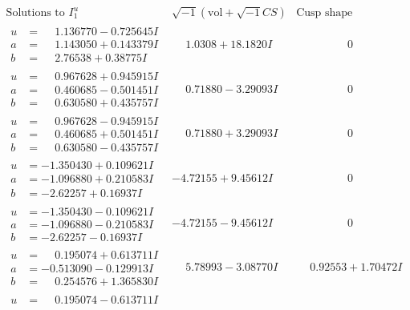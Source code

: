 \documentclass[1p]{elsarticle_modified}
\theoremstyle{definition}
\newcommand{\I}{\sqrt{-1}}
\begin{document}
$$\begin{array}{c|c|c}
\text{Solutions to }I^u_{1}& \I (\text{vol} + \sqrt{-1}CS) & \text{Cusp shape}\\
 \hline 
\begin{aligned}
u &= \phantom{-}1.136770 - 0.725645 I \\
a &= \phantom{-}1.143050 + 0.143379 I \\
b &= \phantom{-}2.76538 + 0.38775 I\end{aligned}
 & \phantom{-}1.0308 + 18.1820 I & \phantom{-0.000000 } 0 \\ \hline\begin{aligned}
u &= \phantom{-}0.967628 + 0.945915 I \\
a &= \phantom{-}0.460685 - 0.501451 I \\
b &= \phantom{-}0.630580 + 0.435757 I\end{aligned}
 & \phantom{-}0.71880 - 3.29093 I & \phantom{-0.000000 } 0 \\ \hline\begin{aligned}
u &= \phantom{-}0.967628 - 0.945915 I \\
a &= \phantom{-}0.460685 + 0.501451 I \\
b &= \phantom{-}0.630580 - 0.435757 I\end{aligned}
 & \phantom{-}0.71880 + 3.29093 I & \phantom{-0.000000 } 0 \\ \hline\begin{aligned}
u &= -1.350430 + 0.109621 I \\
a &= -1.096880 + 0.210583 I \\
b &= -2.62257 + 0.16937 I\end{aligned}
 & -4.72155 + 9.45612 I & \phantom{-0.000000 } 0 \\ \hline\begin{aligned}
u &= -1.350430 - 0.109621 I \\
a &= -1.096880 - 0.210583 I \\
b &= -2.62257 - 0.16937 I\end{aligned}
 & -4.72155 - 9.45612 I & \phantom{-0.000000 } 0 \\ \hline\begin{aligned}
u &= \phantom{-}0.195074 + 0.613711 I \\
a &= -0.513090 - 0.129913 I \\
b &= \phantom{-}0.254576 + 1.365830 I\end{aligned}
 & \phantom{-}5.78993 - 3.08770 I & \phantom{-}0.92553 + 1.70472 I \\ \hline\begin{aligned}
u &= \phantom{-}0.195074 - 0.613711 I \\

\end{aligned}
\end{array}$$
\end{document}
